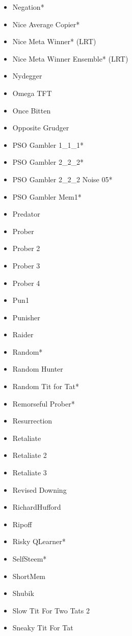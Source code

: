 \begin{appendices}
\begin{multicols}{4}
\begin{itemize}
            \item Negation*
            \item Nice Average Copier*
            \item Nice Meta Winner* (LRT)
            \item Nice Meta Winner Ensemble* (LRT)
            \item Nydegger
            \item Omega TFT
            \item Once Bitten
            \item Opposite Grudger
            \item PSO Gambler 1\_1\_1*
            \item PSO Gambler 2\_2\_2*
            \item PSO Gambler 2\_2\_2 Noise 05*
            \item PSO Gambler Mem1*
            \item Predator
            \item Prober
            \item Prober 2
            \item Prober 3
            \item Prober 4
            \item Pun1
            \item Punisher
            \item Raider
            \item Random*
            \item Random Hunter
            \item Random Tit for Tat*
            \item Remorseful Prober*
            \item Resurrection
            \item Retaliate
            \item Retaliate 2
            \item Retaliate 3
            \item Revised Downing
            \item RichardHufford
            \item Ripoff
            \item Risky QLearner*
            \item SelfSteem*
            \item ShortMem
            \item Shubik
            \item Slow Tit For Two Tats 2
            \item Sneaky Tit For Tat

\end{itemize}
\end{multicols}
\end{appendices}
